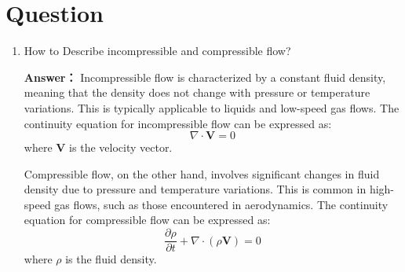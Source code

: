 \documentclass[12pt,a4paper]{article}
\newcounter{question}
\newenvironment{questions}{
    \setcounter{question}{0}
    \section*{Question}
    \begin{enumerate}[leftmargin=1.5em,label={\arabic*．}]
}{
    \end{enumerate}
}
\newcommand{\answer}[1]{\par\noindent\textbf{Answer：} #1\par\vspace{1em}}
\begin{document}
\begin{questions}
{      For Eulerian description, we focus on specific points in space and observe how fluid properties change over time at those points. This approach is commonly used in fluid dynamics, where we analyze flow fields and velocity distributions.
      For Lagrangian description, we track individual fluid particles as they move through space and time. This approach is useful for understanding the trajectory of specific particles and their interactions with the surrounding fluid.  
      \[ a_x = \frac{d u_x}{d t} = \frac{\partial u_x}{\partial t} + u_x \frac{\partial u_x}{\partial x} + u_y \frac{\partial u_x}{\partial y} + u_z \frac{\partial u_x}{\partial z} \]
    Derivation steps are as follows:
      \[
\mathbf{a} = \frac{d \mathbf{V}}{d t} = \frac{d \mathbf{V}(x,y,z,t)}{d t} = \frac{\partial \mathbf{V}}{\partial x} \frac{d x}{d t} + \frac{\partial \mathbf{V}}{\partial y} \frac{d y}{d t} + \frac{\partial \mathbf{V}}{\partial z} \frac{d z}{d t} + \frac{\partial \mathbf{V}}{\partial t}
\]
\[
= \frac{\partial \mathbf{V}}{\partial t} + (\mathbf{V} \cdot \nabla) \mathbf{V}
\]
\[
= \left( \frac{\partial u_x}{\partial t}, \frac{\partial u_y}{\partial t}, \frac{\partial u_z}{\partial t} \right) + \left( u_x \frac{\partial}{\partial x} + u_y \frac{\partial}{\partial y} + u_z \frac{\partial}{\partial z} \right) (u_x, u_y, u_z)
\]
For example,
\[
a_x = \frac{\partial u_x}{\partial t} + u_x \frac{\partial u_x}{\partial x} + u_y \frac{\partial u_x}{\partial y} + u_z \frac{\partial u_x}{\partial z}
\]
      }

    \item How to Describe incompressible and compressible flow?
    
    \answer{
      Incompressible flow is characterized by a constant fluid density, meaning that the density does not change with pressure or temperature variations. This is typically applicable to liquids and low-speed gas flows. The continuity equation for incompressible flow can be expressed as:
      \[
      \nabla \cdot \mathbf{V} = 0
      \]
      where $\mathbf{V}$ is the velocity vector.

      Compressible flow, on the other hand, involves significant changes in fluid density due to pressure and temperature variations. This is common in high-speed gas flows, such as those encountered in aerodynamics. The continuity equation for compressible flow can be expressed as:
      \[
      \frac{\partial \rho}{\partial t} + \nabla \cdot (\rho \mathbf{V}) = 0
      \]
      where $\rho$ is the fluid density.

}
\end{questions}
\end{document}
